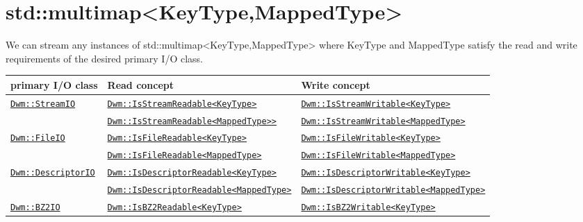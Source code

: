 \begin{minipage}{\textwidth}
\section{\ttfamily std::multimap<KeyType,MappedType>}
We can stream any instances of {\ttfamily std::multimap<KeyType,MappedType>}
where {\ttfamily KeyType} and {\ttfamily MappedType} satisfy the read
and write requirements of the desired primary I/O class.
\vspace{1ex}

\begin{small}
\begin{tabular}{lll}
\textbf{primary I/O class} & \textbf{Read concept} & \textbf{Write concept} \\ \hline
\multirow{2}{*}{\hyperref[section:DwmStreamIOClass]{\texttt{Dwm::StreamIO}}} & \hyperref[concept:DwmIsStreamReadable]{\texttt{Dwm::IsStreamReadable<KeyType>}} & \hyperref[concept:DwmIsStreamWritable]{\texttt{Dwm::IsStreamWritable<KeyType>}} \\
 & \hyperref[concept:DwmIsStreamReadable]{\texttt{Dwm::IsStreamReadable<MappedType>>}} & \hyperref[concept:DwmIsStreamWritable]{\texttt{Dwm::IsStreamWritable<MappedType>}} \\ \hline
\multirow{2}{*}{\hyperref[section:DwmFileIOClass]{\texttt{Dwm::FileIO}}} & \hyperref[concept:DwmIsFileReadable]{\texttt{Dwm::IsFileReadable<KeyType>}} & \hyperref[concept:DwmIsFileWritable]{\texttt{Dwm::IsFileWritable<KeyType>}} \\
 & \hyperref[concept:DwmIsFileReadable]{\texttt{Dwm::IsFileReadable<MappedType>}} & \hyperref[concept:DwmIsFileWritable]{\texttt{Dwm::IsFileWritable<MappedType>}} \\ \hline
\multirow{2}{*}{\hyperref[section:DwmDescriptorIOClass]{\texttt{Dwm::DescriptorIO}}} & \hyperref[concept:DwmIsDescriptorReadable]{\texttt{Dwm::IsDescriptorReadable<KeyType>}} & \hyperref[concept:DwmIsDescriptorWritable]{\texttt{Dwm::IsDescriptorWritable<KeyType>}} \\
 & \hyperref[concept:DwmIsDescriptorReadable]{\texttt{Dwm::IsDescriptorReadable<MappedType>}} & \hyperref[concept:DwmIsDescriptorWritable]{\texttt{Dwm::IsDescriptorWritable<MappedType>}} \\ \hline
\multirow{2}{*}{\hyperref[section:DwmBZ2IOClass]{\texttt{Dwm::BZ2IO}}} & \hyperref[concept:DwmIsBZ2Readable]{\texttt{Dwm::IsBZ2Readable<KeyType>}} & \hyperref[concept:DwmIsBZ2Writable]{\texttt{Dwm::IsBZ2Writable<KeyType>}} \\

\end{tabular}
\end{small}
\end{minipage}
